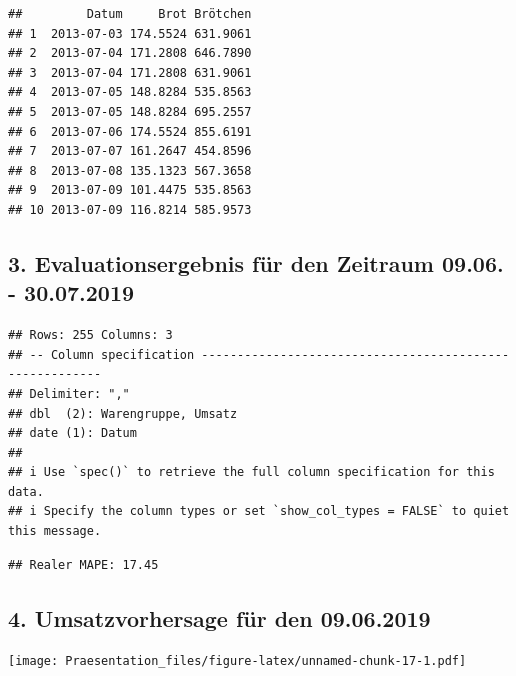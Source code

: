 \documentclass[
]{article}
\begin{document}
\begin{verbatim}
##         Datum     Brot Brötchen
## 1  2013-07-03 174.5524 631.9061
## 2  2013-07-04 171.2808 646.7890
## 3  2013-07-04 171.2808 631.9061
## 4  2013-07-05 148.8284 535.8563
## 5  2013-07-05 148.8284 695.2557
## 6  2013-07-06 174.5524 855.6191
## 7  2013-07-07 161.2647 454.8596
## 8  2013-07-08 135.1323 567.3658
## 9  2013-07-09 101.4475 535.8563
## 10 2013-07-09 116.8214 585.9573
\end{verbatim}

\hypertarget{evaluationsergebnis-fuxfcr-den-zeitraum-09.06.---30.07.2019}{%
\subsection{3. Evaluationsergebnis für den Zeitraum 09.06. -
30.07.2019}\label{evaluationsergebnis-fuxfcr-den-zeitraum-09.06.---30.07.2019}}

\begin{verbatim}
## Rows: 255 Columns: 3
## -- Column specification --------------------------------------------------------
## Delimiter: ","
## dbl  (2): Warengruppe, Umsatz
## date (1): Datum
## 
## i Use `spec()` to retrieve the full column specification for this data.
## i Specify the column types or set `show_col_types = FALSE` to quiet this message.
\end{verbatim}

\begin{verbatim}
## Realer MAPE: 17.45
\end{verbatim}

\hypertarget{umsatzvorhersage-fuxfcr-den-09.06.2019}{%
\subsection{4. Umsatzvorhersage für den
09.06.2019}\label{umsatzvorhersage-fuxfcr-den-09.06.2019}}

\texttt{[image: Praesentation\_files/figure-latex/unnamed-chunk-17-1.pdf]}
\end{document}
